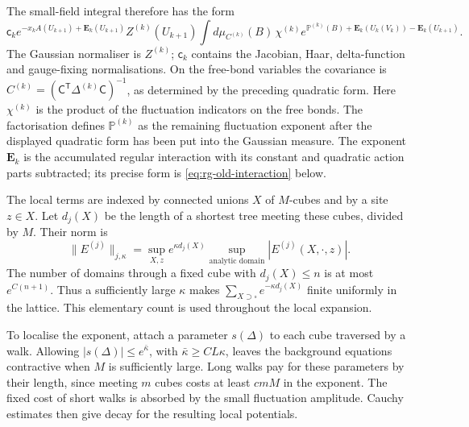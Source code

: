 \documentclass[11pt,letterpaper,reqno]{amsart}
\theoremstyle{definition}
\theoremstyle{remark}
\begin{document}
The small-field integral therefore has the form
\begin{equation}\label{eq:rg-fluctuation-integral}
 \mathsf c_k e^{-x_kA(U_{k+1})+\mathbf E_k(U_{k+1})}
 Z^{(k)}(U_{k+1})
 \int d\mu_{C^{(k)}}(B)\,\chi^{(k)}
 e^{\mathbb P^{(k)}(B)+
       \mathbf E_k(U_k(V_k))-\mathbf E_k(U_{k+1})}.
\end{equation}
The Gaussian normaliser is $Z^{(k)}$; $\mathsf c_k$ contains the
Jacobian, Haar, delta-function and gauge-fixing normalisations.
On the free-bond variables the covariance is
$C^{(k)}=(\mathsf C^{\mathsf T}\Delta^{(k)}\mathsf C)^{-1}$,
as determined by the preceding quadratic form.
Here $\chi^{(k)}$ is the product of the fluctuation indicators on
the free bonds. The factorisation defines $\mathbb P^{(k)}$ as the
remaining fluctuation exponent after the displayed quadratic form
has been put into the Gaussian measure.
The exponent $\mathbf E_k$ is the accumulated regular interaction
with its constant and quadratic action parts subtracted; its precise
form is \eqref{eq:rg-old-interaction} below.

The local terms are indexed by connected unions $X$ of $M$-cubes and
by a site $z\in X$. Let $d_j(X)$ be the length of a shortest tree
meeting these cubes, divided by $M$. Their norm is
\[
 \|E^{(j)}\|_{j,\kappa}
 =\sup_{X,z}e^{\kappa d_j(X)}
                  \sup_{\text{analytic domain}}|E^{(j)}(X,\cdot,z)|.
\]
The number of domains through a fixed cube with $d_j(X)\le n$ is
at most $e^{C(n+1)}$. Thus a sufficiently large $\kappa$ makes
$\sum_{X\supset\square}e^{-\kappa d_j(X)}$ finite uniformly in
the lattice. This elementary count is used throughout the local
expansion.

To localise the exponent, attach a parameter $s(\Delta)$ to each
cube traversed by a walk. Allowing
$|s(\Delta)|\le e^{\bar\kappa}$, with
$\bar\kappa\ge CL\kappa$, leaves the background equations
contractive when $M$ is sufficiently large. Long walks pay for these
parameters by their length, since meeting $m$ cubes costs at least
$cmM$ in the exponent. The fixed cost of short walks is absorbed by
the small fluctuation amplitude. Cauchy estimates then give decay
for the resulting local potentials.
\end{document}
